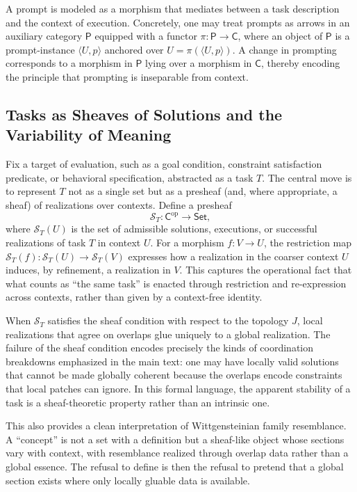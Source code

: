 \documentclass[12pt]{article}
\begin{document}
A prompt is modeled as a morphism that mediates between a task description and the context of execution. Concretely, one may treat prompts as arrows in an auxiliary category $\mathsf{P}$ equipped with a functor $\pi:\mathsf{P}\to\mathsf{C}$, where an object of $\mathsf{P}$ is a prompt-instance $\langle U,p\rangle$ anchored over $U=\pi(\langle U,p\rangle)$. A change in prompting corresponds to a morphism in $\mathsf{P}$ lying over a morphism in $\mathsf{C}$, thereby encoding the principle that prompting is inseparable from context.

\subsection{Tasks as Sheaves of Solutions and the Variability of Meaning}

Fix a target of evaluation, such as a goal condition, constraint satisfaction predicate, or behavioral specification, abstracted as a task $T$. The central move is to represent $T$ not as a single set but as a presheaf (and, where appropriate, a sheaf) of realizations over contexts. Define a presheaf
\[
\mathcal{S}_T : \mathsf{C}^{\mathrm{op}} \longrightarrow \mathsf{Set},
\]
where $\mathcal{S}_T(U)$ is the set of admissible solutions, executions, or successful realizations of task $T$ in context $U$. For a morphism $f: V \to U$, the restriction map $\mathcal{S}_T(f):\mathcal{S}_T(U)\to\mathcal{S}_T(V)$ expresses how a realization in the coarser context $U$ induces, by refinement, a realization in $V$. This captures the operational fact that what counts as ``the same task'' is enacted through restriction and re-expression across contexts, rather than given by a context-free identity.

When $\mathcal{S}_T$ satisfies the sheaf condition with respect to the topology $J$, local realizations that agree on overlaps glue uniquely to a global realization. The failure of the sheaf condition encodes precisely the kinds of coordination breakdowns emphasized in the main text: one may have locally valid solutions that cannot be made globally coherent because the overlaps encode constraints that local patches can ignore. In this formal language, the apparent stability of a task is a sheaf-theoretic property rather than an intrinsic one.

This also provides a clean interpretation of Wittgensteinian family resemblance. A ``concept'' is not a set with a definition but a sheaf-like object whose sections vary with context, with resemblance realized through overlap data rather than a global essence. The refusal to define is then the refusal to pretend that a global section exists where only locally gluable data is available.
\end{document}
